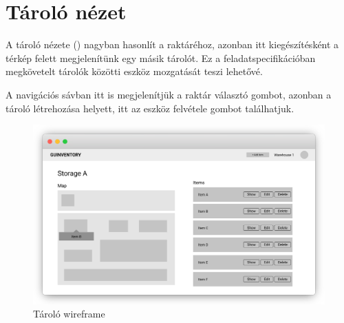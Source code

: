 \section{Tároló nézet}
A tároló nézete () nagyban hasonlít a raktáréhoz, azonban itt kiegészítésként a térkép felett megjelenítünk egy másik tárolót.
Ez a feladatspecifikációban megkövetelt tárolók közötti eszköz mozgatását teszi lehetővé.

A navigációs sávban itt is megjelenítjük a raktár választó gombot, azonban a tároló létrehozása helyett, itt az eszköz felvétele gombot találhatjuk.

\begin{figure}[!ht]
  \centering
  \includegraphics[width=150mm, keepaspectratio]{figures/wireframes/frame_storage.png}
  \caption{Tároló wireframe}
  \label{fig:StorageWireframe}
\end{figure}
  